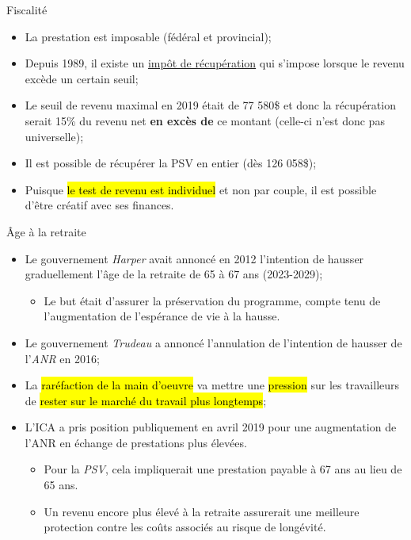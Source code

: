 \documentclass[10pt, french]{article}
\begin{document}
\begin{multicols*}{3}
\begin{conceptgen}{Fiscalité}
\begin{itemize}[leftmargin = *]
	\item	La prestation est imposable (\textcolor{bulgarianrose}{fédéral} et \textcolor{blue(pigment)}{provincial});
	\item	Depuis 1989, il existe un \hypertarget{recup_tx_explain}{\hyperlink{recup_tx_l8r1}{\textcolor{blue_rectangle}{impôt de récupération}}} qui s'impose lorsque le revenu excède un certain seuil;
	\item	Le seuil de revenu maximal en 2019 était de 77 580\$ et donc la récupération serait 15\% du revenu net \textbf{en excès de} ce montant (celle-ci n'est donc pas universelle);
	\item	Il est possible de récupérer la PSV en entier (dès 126 058\$);
	\item	Puisque \hl{le test de revenu est individuel} et non par couple, il est possible d'être créatif avec ses finances.
\end{itemize}
\end{conceptgen}

\begin{conceptgen}{Âge à la retraite}
	\begin{itemize}[leftmargin = *]
		\item	Le gouvernement \textit{Harper} avait annoncé en 2012 l'intention de hausser graduellement l'âge de la retraite de 65 à 67 ans (2023-2029);
				\begin{itemize}[leftmargin = *]
				\item Le but était d'assurer la préservation du programme, compte tenu de l'augmentation de l'espérance de vie à la hausse.
				\end{itemize}
		\item	Le gouvernement \textit{Trudeau} a annoncé l'annulation de l'intention de hausser de l'\textit{ANR} en 2016;
		\item	La \hl{raréfaction de la main d'oeuvre} va mettre une \hl{pression} sur les travailleurs de \hl{rester sur le marché du travail plus longtemps};
		\item	L'ICA a pris position publiquement en avril 2019 pour une augmentation de l'ANR en échange de prestations plus élevées.
				\begin{itemize}[leftmargin = *]
				\item Pour la \textit{PSV}, cela impliquerait une prestation payable à 67 ans au lieu de 65 ans.
				\item Un revenu encore plus élevé à la retraite assurerait une meilleure protection contre les coûts associés au risque de longévité.
				\end{itemize}
	\end{itemize}
\end{conceptgen}


\end{multicols*}
\end{document}
